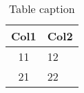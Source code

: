 \begin{table}[!t]
\label{tab:label}
\begin{center}
\begin{tabular}{|c|p{3.3cm}|}
\hline
Col1 & Col2
\tabularnewline
\hline
11   & 12
\tabularnewline
\hline
21   & 22
\tabularnewline
\hline
\end{tabular}
\caption{\label{tab:table-name}Table caption}
\end{center}
\end{table}
